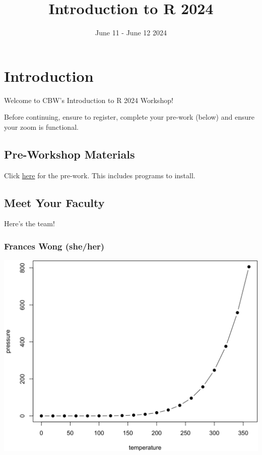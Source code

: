 \documentclass[
]{book}
\title{Introduction to R 2024}
\author{}
\date{\vspace{-2.5em}June 11 - June 12 2024}
\theoremstyle{definition}
\theoremstyle{definition}
\theoremstyle{definition}
\theoremstyle{definition}
\theoremstyle{remark}
\begin{document}
\maketitle

{
\setcounter{tocdepth}{1}
\tableofcontents
}
\chapter{Introduction}\label{introduction}

Welcome to CBW's Introduction to R 2024 Workshop!

Before continuing, ensure to register, complete your pre-work (below) and ensure your zoom is functional.

\section{Pre-Workshop Materials}\label{prework}

Click \href{https://forms.gle/xba2wVbLXtC1E1Dx9}{here} for the pre-work. This includes programs to install.

\section*{Meet Your Faculty}\label{nice-label}

Here's the team!

\subsection*{\texorpdfstring{Frances Wong (she/her) }{Frances Wong  (she/her) }}\label{frances-wong-sheher}

\begin{center}\includegraphics[width=0.65\linewidth]{./_main_files/figure-html/nice-fig-1} \end{center}
\end{document}

